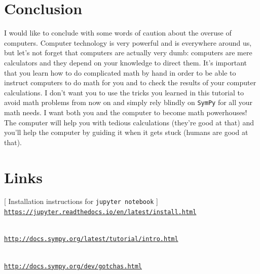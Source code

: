 \documentclass[9pt]{IEEEtran}
\begin{document}








\vspace{-2mm}
\section*{Conclusion}
\label{sec:conclusion}

I would like to conclude with some words of caution about the overuse of computers.
Computer technology is very powerful and is everywhere around us,
but let's not forget that computers are actually very dumb:
computers are mere calculators and they depend on your knowledge to direct them.
It's important that you learn how to do complicated math by hand in order to be 
able to instruct computers to do math for you and to check the results of your computer calculations.
I don't want you to use the tricks you learned in this tutorial to avoid math problems from now on
and simply rely blindly on \texttt{SymPy} for all your math needs.
I want both you and the computer to become math powerhouses!
The computer will help you with tedious calculations (they're good at that)
and you'll help the computer by guiding it when it gets  stuck (humans are good at that).





\section*{Links}
\label{sec:links}

[ Installation instructions for \texttt{jupyter notebook} ] \\ 
\href{https://jupyter.readthedocs.io/en/latest/install.html}{\texttt{https://jupyter.readthedocs.io/en/latest/install.html}}

 \\ 
\href{http://docs.sympy.org/latest/tutorial/intro.html}{\texttt{http://docs.sympy.org/latest/tutorial/intro.html}}

 \\ 
\href{http://docs.sympy.org/dev/gotchas.html}{\texttt{http://docs.sympy.org/dev/gotchas.html}}
\end{document}
